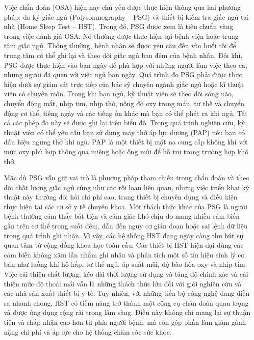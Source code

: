 Việc chẩn đoán (OSA) hiện nay chủ yếu được thực hiện thông qua hai phương pháp:
đa ký giấc ngủ (Polysomnography – PSG) và thiết bị kiểm tra giấc ngủ tại nhà
(Home Sleep Test – HST). Trong đó, PSG được xem là tiêu chuẩn vàng trong việc
đánh giá OSA. Nó thường được thực hiện tại bệnh viện hoặc trung tâm giấc ngủ.
Thông thường, bệnh nhân sẽ được yêu cầu đến vào buổi tối để trung tâm có thể
ghi lại và theo dõi giấc ngủ ban đêm của bệnh nhân. Đôi khi, PSG được thực hiện
vào ban ngày để phù hợp với những người làm việc theo ca, những người đã quen
với việc ngủ ban ngày. Quá trình đo PSG phải được thực hiện dưới sự giám sát
trực tiếp của bác sỹ chuyên ngành giấc ngủ hoặc kĩ thuật viên có chuyên
môn\cite{psg_paper}\cite{kushida2005psg}. Trong khi bạn ngủ, kỹ thuật viên sẽ
theo dõi sóng não, chuyển động mắt, nhịp tim, nhịp thở, nồng độ oxy trong máu,
tư thế và chuyển động cơ thể, tiếng ngáy và các tiếng ồn khác mà bạn có thể
phát ra khi ngủ. Tất cả các phép đo này sẽ được ghi lại trên biểu đồ. Trong quá
trình nghiên cứu, kỹ thuật viên có thể yêu cầu bạn sử dụng máy thở áp lực dương
(PAP) nếu bạn có dấu hiệu ngưng thở khi ngủ. PAP là một thiết bị mặt nạ cung
cấp không khí với mức oxy phù hợp thông qua miệng hoặc ống mũi để hỗ trợ trong
trường hợp khó thở.

Mặc dù PSG vẫn giữ vai trò là phương pháp tham chiếu trong chẩn đoán và theo
dõi chất lượng giấc ngủ cũng như các rối loạn liên quan, nhưng việc triển khai
kỹ thuật này thường đòi hỏi chi phí cao, trang thiết bị chuyên dụng và điều
kiện thực hiện tại các cơ sở y tế chuyên khoa. Một thách thức khác của PSG là
người bệnh thường cảm thấy bất tiện và cảm giác khó chịu do mang nhiều cảm biến
gắn trên cơ thể trong suốt đêm, dẫn đến nguy cơ gián đoạn hoặc sai lệnh dữ liệu
trong quá trình ghi nhận. Vì vậy, các hệ thống HST đang ngày càng thu hút sự
quan tâm từ cộng đồng khoa học toàn
cầu\cite{e3hst}\cite{hstSurvey}\cite{hst_paper}. Các thiết bị HST hiện đại dùng
các cảm biến không xâm lấn nhằm ghi nhận và phân tích một số tín hiệu sinh lý
cơ bản như luồng khí hô hấp, tư thế ngủ, áp suất mũi, độ bão hòa oxy và nhịp
tim. Việc cải thiện chất lượng, kéo dài thời lượng sử dụng và tăng độ chính xác
và cải thiện mức độ thoải mái vẫn là những thách thức lớn đối với giới nghiên
cứu và các nhà sản xuất thiết bị y tế. Tuy nhiên, với những tiến bộ công nghệ
đang diễn ra nhanh chóng, HST có tiềm năng trở thành một công cụ chẩn đoán quan
trọng và được ứng dụng rộng rãi trong lâm sàng. Điều này không chỉ mang lại sự
thuận tiện và chấp nhận cao hơn từ phía người bệnh, mà còn góp phần làm giảm
gánh nặng chi phí và áp lực cho hệ thống chăm sóc sức khỏe.

